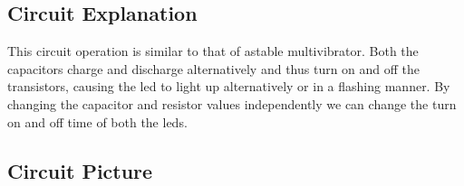 \subsection{Circuit Explanation}
This circuit operation is similar to that of astable multivibrator. Both the capacitors charge and discharge alternatively and thus turn on and off the transistors, causing the led to light up alternatively or in a flashing manner. By changing the capacitor and resistor values independently we can change the turn on and off time of both the leds.
\subsection{Circuit Picture}
